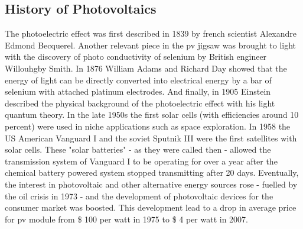 \subsection{History of Photovoltaics}
The photoelectric effect was first described in 1839 by french scientist Alexandre 
Edmond \linebreak[4] 
Becquerel\cite{becquerel1839memoire}. %
Another relevant piece in the \gls{pv} jigsaw was brought to light
with the discovery of photo conductivity of selenium
by British engineer Willouhgby Smith\cite{Smith1873Selenium}.
In 1876 William Adams and Richard Day\cite{Adams1876Selenium} showed that 
the energy of light can be directly converted into electrical energy by a bar of 
selenium with attached platinum electrodes.
And finally, in 1905 Einstein described the physical background of the photoelectric 
effect with his light quantum theory\cite{einstein1905erzeugung}.
In the late 1950s the first solar cells (with efficiencies around 10 percent\cite{prince1958}) were used in niche applications such as space exploration.  
In 1958 the US American Vanguard I\cite{vanguard2004} and the soviet Sputnik III\cite{sputnik1959} were the first satellites with solar cells.
These "solar batteries" - as they were called then - allowed the transmission system of Vanguard I to be operating for over a year after the chemical battery powered system stopped transmitting after 20 days\cite{vanguard2004}. 
%
Eventually, the interest in photovoltaic and other alternative energy sources 
rose - fuelled by the oil crisis in 1973 - 
and the development of photovoltaic devices for the consumer market was boosted. 
This development lead to a drop in 
average price for \gls{pv} module from \$ 100 per watt in 1975 to \$ 4 per watt in 2007\cite{pagliaro2008flexible}.

